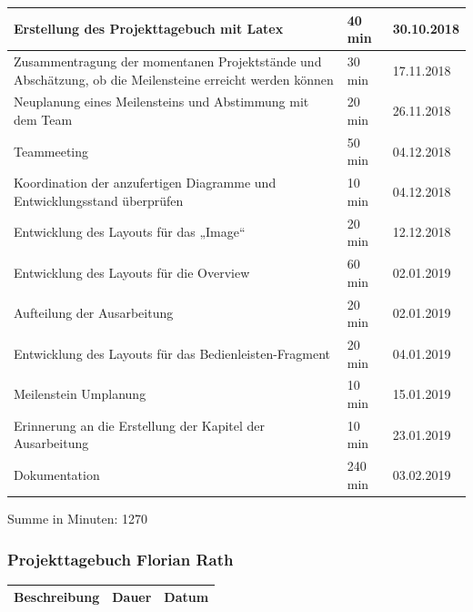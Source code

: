 \begin{longtable}{|p{10cm}|p{2cm}|p{2cm}|}
Erstellung des Projekttagebuch mit Latex & 40 min & 30.10.2018 \\ \hline
Zusammentragung der momentanen Projektstände und Abschätzung, ob die Meilensteine erreicht werden können & 30 min & 17.11.2018 \\ \hline
Neuplanung eines Meilensteins und Abstimmung mit dem Team & 20 min & 26.11.2018 \\ \hline
Teammeeting & 50 min & 04.12.2018 \\ \hline
Koordination der anzufertigen Diagramme und Entwicklungsstand überprüfen& 10 min & 04.12.2018 \\ \hline
Entwicklung des Layouts für das „Image“ & 20 min & 12.12.2018 \\ \hline
Entwicklung des Layouts für die Overview &  60 min & 02.01.2019 \\ \hline
Aufteilung der Ausarbeitung & 20 min & 02.01.2019 \\ \hline
Entwicklung des Layouts für das Bedienleisten-Fragment & 20 min & 04.01.2019 \\ \hline
Meilenstein Umplanung & 10 min & 15.01.2019 \\ \hline
Erinnerung an die Erstellung der Kapitel der Ausarbeitung & 10 min & 23.01.2019 \\ \hline
Dokumentation & 240 min & 03.02.2019 \\ \hline
\end{longtable}
Summe in Minuten: 1270

\newpage
\subsubsection{Projekttagebuch Florian Rath}
\begin{longtable}{|p{10cm}|p{2cm}|p{2cm}|}
\hline
{\textbf{Beschreibung}} & {\textbf{Dauer}} & {\textbf{Datum}} \\ \hline

\end{longtable}

\newpage
